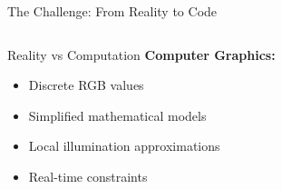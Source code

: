 \begin{frame}{The Challenge: From Reality to Code}
\begin{columns}
\begin{column}{0.5\textwidth}
\begin{conceptbox}{Reality vs Computation}
        \vspace{0.3cm}
        \textbf{Computer Graphics:}
        \begin{itemize}
            \footnotesize
          \item Discrete RGB values
          \item Simplified mathematical models
          \item Local illumination approximations
          \item Real-time constraints
        \end{itemize}
      \end{conceptbox}
    \end{column}
  \end{columns}
\end{frame}
